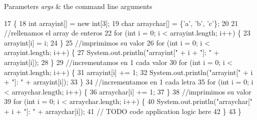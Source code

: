 \begin{DoxyParams}{Parameters}
{\em args} & the command line arguments \\
\hline
\end{DoxyParams}

\begin{DoxyCode}
17                                            \{
18         \textcolor{keywordtype}{int} arrayint[] = \textcolor{keyword}{new} \textcolor{keywordtype}{int}[3];
19         \textcolor{keywordtype}{char} arraychar[] = \{\textcolor{charliteral}{'a'}, \textcolor{charliteral}{'b'}, \textcolor{charliteral}{'c'}\};
20  
21         \textcolor{comment}{//rellenamos el array de enteros}
22         \textcolor{keywordflow}{for} (\textcolor{keywordtype}{int} i = 0; i < arrayint.length; i++) \{
23             arrayint[i] = i;
24         \}
25         \textcolor{comment}{//imprimimos su valor}
26         \textcolor{keywordflow}{for} (\textcolor{keywordtype}{int} i = 0; i < arrayint.length; i++) \{
27             System.out.println(\textcolor{stringliteral}{"arrayint["} + i + \textcolor{stringliteral}{"]: "} + arrayint[i]);
28         \}
29         \textcolor{comment}{//incrementamos en 1 cada valor}
30         \textcolor{keywordflow}{for} (\textcolor{keywordtype}{int} i = 0; i < arrayint.length; i++) \{
31             arrayint[i] += 1;
32             System.out.println(\textcolor{stringliteral}{"arrayint["} + i + \textcolor{stringliteral}{"]: "} + arrayint[i]);
33         \}
34         \textcolor{comment}{//incrementamos en 1 cada letra}
35         \textcolor{keywordflow}{for} (\textcolor{keywordtype}{int} i = 0; i < arraychar.length; i++) \{
36             arraychar[i] += 1;
37         \}
38         \textcolor{comment}{//imprimimos su valor}
39         \textcolor{keywordflow}{for} (\textcolor{keywordtype}{int} i = 0; i < arraychar.length; i++) \{
40             System.out.println(\textcolor{stringliteral}{"arraychar["} + i + \textcolor{stringliteral}{"]: "} + arraychar[i]);
41         \textcolor{comment}{// TODO code application logic here}
42         \}
43     \}
\end{DoxyCode}
